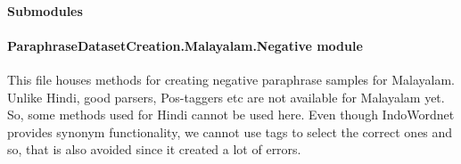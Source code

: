 \documentclass[letterpaper,10pt,english]{sphinxmanual}
\begin{document}
\paragraph{Submodules}
\label{\detokenize{ParaphraseDatasetCreation.Malayalam:submodules}}

\paragraph{ParaphraseDatasetCreation.Malayalam.Negative module}
\label{\detokenize{ParaphraseDatasetCreation.Malayalam:module-ParaphraseDatasetCreation.Malayalam.Negative}}\label{\detokenize{ParaphraseDatasetCreation.Malayalam:paraphrasedatasetcreation-malayalam-negative-module}}
This file houses methods for creating negative paraphrase samples for 
Malayalam. Unlike Hindi, good parsers, Pos-taggers etc are not available
for Malayalam yet. So, some methods used for Hindi cannot be used here. 
Even though IndoWordnet provides synonym functionality, we cannot use 
tags to select the correct ones and so, that is also avoided since it 
created a lot of errors.
\end{document}
